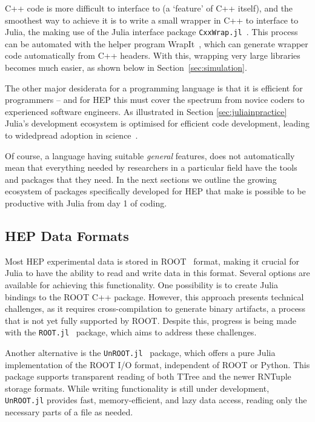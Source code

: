 \documentclass{webofc}
\begin{document}

C++ code is more difficult to interface to (a `feature' of C++ itself), and the
smoothest way to achieve it is to write a small wrapper in C++ to interface to
Julia, the making use of the Julia interface package
\texttt{CxxWrap.jl}~\cite{CxxWrap.jl}. This process can be automated with the
helper program WrapIt~\cite{wrapit-github}, which can generate wrapper code
automatically from C++ headers. With this, wrapping very large libraries becomes
much easier, as shown below in Section~\ref{sec:simulation}.

The other major desiderata for a programming language is that it is efficient
for programmers -- and for HEP this must cover the spectrum from novice coders
to experienced software engineers. As illustrated in Section
\ref{sec:juliainpractice} Julia's development ecosystem is optimised for
efficient code development, leading to widedpread adoption in science~\cite{perkel-julia-science}.

Of course, a language having suitable \emph{general} features, does not
automatically mean that everything needed by researchers in a particular field have the tools and packages that they need. In the
next sections we outline the growing ecosystem of packages specifically
developed for HEP that make is possible to be productive with Julia from day 1
of coding. 

\subsection{HEP Data Formats}
\label{sec:hepdataformats}

Most HEP experimental data is stored in ROOT~\cite{ROOT:2011zz} format, making it crucial for Julia to have the ability to read and write data in this format. Several options are available for achieving this functionality. One possibility is to create Julia bindings to the ROOT C++ package. However, this approach presents technical challenges, as it requires cross-compilation to generate binary artifacts, a process that is not yet fully supported by ROOT. Despite this, progress is being made with the \texttt{ROOT.jl}~\cite{ROOT_jl} package, which aims to address these challenges.

Another alternative is the \texttt{UnROOT.jl}~\cite{UnROOT:2022vnn} package, which offers a pure Julia implementation of the ROOT I/O format, independent of ROOT or Python. This package supports transparent reading of both TTree and the newer RNTuple storage formats. While writing functionality is still under development, \texttt{UnROOT.jl} provides fast, memory-efficient, and lazy data access, reading only the necessary parts of a file as needed.
\end{document}
